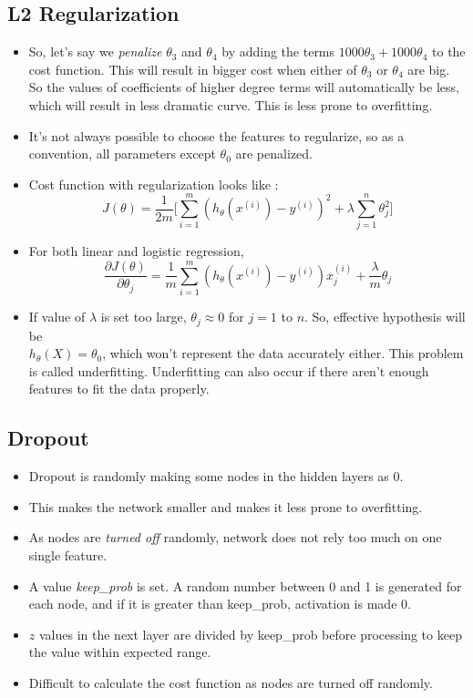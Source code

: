 \documentclass{article}
\begin{document}
\subsection{L2 Regularization}
\begin{itemize}
	\item So, let's say we \emph{penalize} $\theta_3$ and $\theta_4$ by adding the terms $1000\theta_3 + 1000\theta_4$ to the cost function. This will result in bigger cost when either of $\theta_3$ or $\theta_4$ are big. So the values of coefficients of higher degree terms will automatically be less, which will result in less dramatic curve. This is less prone to overfitting.
	\item It's not always possible to choose the features to regularize, so as a convention, all parameters except $\theta_0$ are penalized.
	\item Cost function with regularization looks like :
	$$J(\theta)= \frac{1}{2m} \Bigg[\sum_{i=1}^{m} (h_\theta(x^{(i)})-y^{(i)})^2 + \lambda \sum_{j=1}^n \theta_j^2 \Bigg]$$
	\item For both linear and logistic regression,
	$$\frac{\partial J(\theta)}{\partial \theta_j}=\frac{1}{m} \sum_{i=1}^{m} (h_\theta(x^{(i)})-y^{(i)})x_j^{(i)} + \frac{\lambda}{m} \theta_j$$
	\item If value of $\lambda$ is set too large, $\theta_j\approx 0$ for $j=1$ to $n$. So, effective hypothesis will be\\ $h_\theta(X)=\theta_0$, which won't represent the data accurately either. This problem is called underfitting. Underfitting can also occur if there aren't enough features to fit the data properly.
\end{itemize}
\subsection{Dropout}
\begin{itemize}
	\item Dropout is randomly making some nodes in the hidden layers as 0.
	\item This makes the network smaller and makes it less prone to overfitting.
	\item As nodes are \emph{turned off} randomly, network does not rely too much on one single feature.
	\item A value \emph{keep\_prob} is set. A random number between 0 and 1 is generated for each node, and if it is greater than keep\_prob, activation is made 0.
	\item $z$ values in the next layer are divided by keep\_prob before processing to keep the value within expected range.
	\item Difficult to calculate the cost function as nodes are turned off randomly.
\end{itemize}
\end{document}
